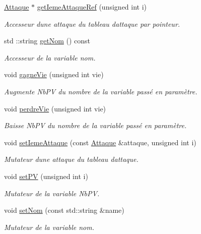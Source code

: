\begin{DoxyCompactItemize}
\hyperlink{class_attaque}{Attaque} $\ast$ \hyperlink{class_pokemon_a5688276dbf96174ceccec44d416f2df6}{get\+Ieme\+Attaque\+Ref} (unsigned int i)
\begin{DoxyCompactList}\small\item\em Accesseur d\textquotesingle{}une attaque du tableau d\textquotesingle{}attaque par pointeur. \end{DoxyCompactList}\item 
std \+::string \hyperlink{class_pokemon_aca789a69b00c4e4189571507539bbc30}{get\+Nom} () const
\begin{DoxyCompactList}\small\item\em Accesseur de la variable nom. \end{DoxyCompactList}\item 
void \hyperlink{class_pokemon_ac5ce7b3dd6a431cbc5d73c27e4aeac36}{gagne\+Vie} (unsigned int vie)
\begin{DoxyCompactList}\small\item\em Augmente Nb\+PV du nombre de la variable passé en paramètre. \end{DoxyCompactList}\item 
void \hyperlink{class_pokemon_aa036561ffd7e31e668b37785e88a8c51}{perdre\+Vie} (unsigned int vie)
\begin{DoxyCompactList}\small\item\em Baisse Nb\+PV du nombre de la variable passé en paramètre. \end{DoxyCompactList}\item 
void \hyperlink{class_pokemon_a52226bbf55f0721dcc143061aeaffd5c}{set\+Ieme\+Attaque} (const \hyperlink{class_attaque}{Attaque} \&attaque, unsigned int i)
\begin{DoxyCompactList}\small\item\em Mutateur d\textquotesingle{}une attaque du tableau d\textquotesingle{}attaque. \end{DoxyCompactList}\item 
void \hyperlink{class_pokemon_a2cc7213be7abb087f4b55b2a55816e55}{set\+PV} (unsigned int i)
\begin{DoxyCompactList}\small\item\em Mutateur de la variable Nb\+PV. \end{DoxyCompactList}\item 
void \hyperlink{class_pokemon_af8bb49fc8e2afaec5cdfdb764d0a2485}{set\+Nom} (const std\+::string \&name)
\begin{DoxyCompactList}\small\item\em Mutateur de la variable nom. \end{DoxyCompactList}\item 

\end{DoxyCompactItemize}

